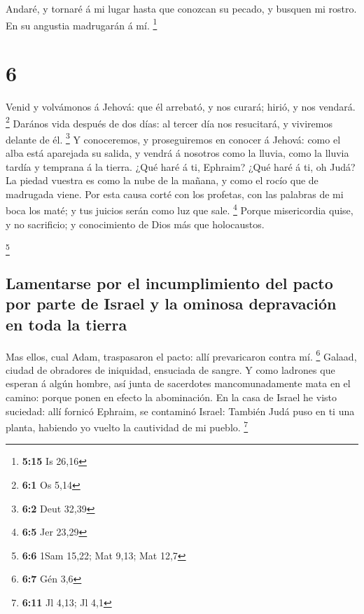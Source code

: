  Andaré, y tornaré á mi lugar hasta que conozcan su pecado,
y busquen mi rostro. En su angustia madrugarán á mí. \footnote{\textbf{5:15}
  Is 26,16}

\hypertarget{section-5}{%
\section{6}\label{section-5}}

 Venid y volvámonos á Jehová: que él arrebató, y nos curará;
hirió, y nos vendará. \footnote{\textbf{6:1} Os 5,14} 
Darános vida después de dos días: al tercer día nos resucitará, y
viviremos delante de él. \footnote{\textbf{6:2} Deut 32,39} 
Y conoceremos, y proseguiremos en conocer á Jehová: como el alba está
aparejada su salida, y vendrá á nosotros como la lluvia, como la lluvia
tardía y temprana á la tierra.  ¿Qué haré á ti, Ephraim?
¿Qué haré á ti, oh Judá? La piedad vuestra es como la nube de la mañana,
y como el rocío que de madrugada viene.  Por esta causa
corté con los profetas, con las palabras de mi boca los maté; y tus
juicios serán como luz que sale. \footnote{\textbf{6:5} Jer 23,29}
 Porque misericordia quise, y no sacrificio; y conocimiento
de Dios más que holocaustos.

\footnote{\textbf{6:6} 1Sam 15,22; Mat 9,13; Mat 12,7}

\hypertarget{lamentarse-por-el-incumplimiento-del-pacto-por-parte-de-israel-y-la-ominosa-depravaciuxf3n-en-toda-la-tierra}{%
\subsection{Lamentarse por el incumplimiento del pacto por parte de
Israel y la ominosa depravación en toda la
tierra}\label{lamentarse-por-el-incumplimiento-del-pacto-por-parte-de-israel-y-la-ominosa-depravaciuxf3n-en-toda-la-tierra}}

 Mas ellos, cual Adam, traspasaron el pacto: allí
prevaricaron contra mí. \footnote{\textbf{6:7} Gén 3,6} 
Galaad, ciudad de obradores de iniquidad, ensuciada de sangre.
 Y como ladrones que esperan á algún hombre, así junta de
sacerdotes mancomunadamente mata en el camino: porque ponen en efecto la
abominación.  En la casa de Israel he visto suciedad: allí
fornicó Ephraim, se contaminó Israel:  También Judá puso en
ti una planta, habiendo yo vuelto la cautividad de mi pueblo.
\footnote{\textbf{6:11} Jl 4,13; Jl 4,1}

